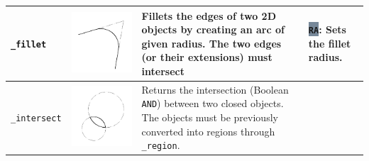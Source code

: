 \documentclass[..]{../IEEEphot}
\newcommand{\param}[1]{\colorbox{LightSlateGray}{\color{Navy}\texttt{\textbf{#1}}}}
\begin{document}
\begin{center}
\begin{longtable}{m{.2\linewidth}m{.2\linewidth}m{.25\linewidth}m{.25\linewidth}}
\\	
\midrule
\texttt{\_fillet} & \includegraphics[width = 0.8\linewidth, keepaspectratio]{../images/jpg/_fillet.jpg} & Fillets the edges of two 2D objects by creating an arc of given radius. The two edges (or their extensions) must intersect & 
\param{RA}: Sets the fillet radius.
\\
\midrule
\texttt{\_intersect} & \includegraphics[width = 0.8\linewidth, keepaspectratio]{../images/jpg/_intersect.jpg} & Returns the intersection (Boolean \texttt{AND}) between two closed objects. The objects must be previously converted into regions through \texttt{\_region}. & 

\end{longtable}
\end{center}
\end{document}
